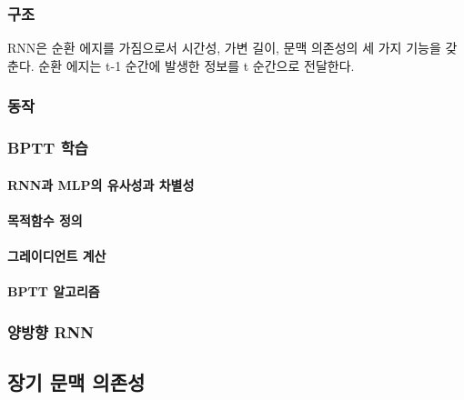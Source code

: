 \documentclass [12pt] {oblivoir}
\let\oldsubsubsection=\subsubsection
\renewcommand{\subsubsection}
{
  \filbreak
  \oldsubsubsection
}
\begin{document}
\subsubsection{구조}

RNN은 순환 에지를 가짐으로서 시간성, 가변 길이, 문맥 의존성의 세 가지 기능을 갖춘다.
순환 에지는 t-1 순간에 발생한 정보를 t 순간으로 전달한다.

\subsubsection{동작}

\subsubsection{BPTT 학습}

\paragraph*{RNN과 MLP의 유사성과 차별성}\mbox{}

\vspace{3mm}

\paragraph*{목적함수 정의}\mbox{}

\vspace{3mm}

\paragraph*{그레이디언트 계산}\mbox{}

\vspace{3mm}

\paragraph*{BPTT 알고리즘}\mbox{}

\vspace{3mm}

\subsubsection{양방향 RNN}

\subsection{장기 문맥 의존성}
\end{document}
